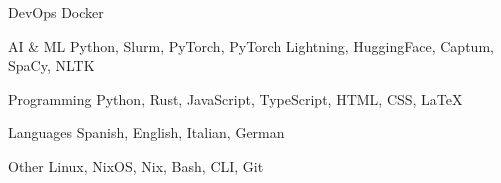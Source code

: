 

\begin{cvskills}

  \cvskill
    {DevOps} %
    {Docker} %

  \cvskill
    {AI \& ML} %
    {Python, Slurm, PyTorch, PyTorch Lightning, HuggingFace, Captum, SpaCy, NLTK} %

  \cvskill
    {Programming} %
    {Python, Rust, JavaScript, TypeScript, HTML, CSS, LaTeX} %

  \cvskill
    {Languages} %
    {Spanish, English, Italian, German} %

  \cvskill
    {Other}
    {Linux, NixOS, Nix, Bash, CLI, Git}

\end{cvskills}
